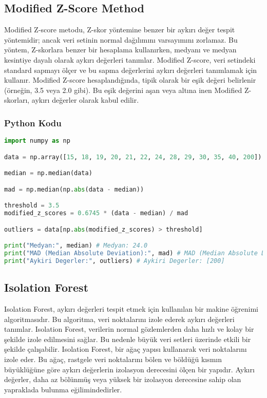 \newpage

\subsection{Modified Z-Score Method}
Modified Z-score metodu, Z-skor yöntemine benzer bir aykırı değer tespit yöntemidir; ancak veri setinin normal dağılımını varsayımını zorlamaz. Bu yöntem, Z-skorlara benzer bir hesaplama kullanırken, medyanı ve medyan kesintiye dayalı olarak aykırı değerleri tanımlar. Modified Z-score, veri setindeki standard sapmayı ölçer ve bu sapma değerlerini aykırı değerleri tanımlamak için kullanır. Modified Z-score hesaplandığında, tipik olarak bir eşik değeri belirlenir (örneğin, 3.5 veya 2.0 gibi). Bu eşik değerini aşan veya altına inen Modified Z-skorları, aykırı değerler olarak kabul edilir.

\subsubsection{Python Kodu}

\begin{lstlisting}[language=Python]
import numpy as np

data = np.array([15, 18, 19, 20, 21, 22, 24, 28, 29, 30, 35, 40, 200])

median = np.median(data)

mad = np.median(np.abs(data - median))

threshold = 3.5
modified_z_scores = 0.6745 * (data - median) / mad

outliers = data[np.abs(modified_z_scores) > threshold]

print("Medyan:", median) # Medyan: 24.0
print("MAD (Median Absolute Deviation):", mad) # MAD (Median Absolute Deviation): 5.0
print("Aykiri Degerler:", outliers) # Aykiri Degerler: [200]
\end{lstlisting}

\newpage

\subsection{Isolation Forest}
Isolation Forest, aykırı değerleri tespit etmek için kullanılan bir makine öğrenimi algoritmasıdır. Bu algoritma, veri noktalarını izole ederek aykırı değerleri tanımlar. Isolation Forest, verilerin normal gözlemlerden daha hızlı ve kolay bir şekilde izole edilmesini sağlar. Bu nedenle büyük veri setleri üzerinde etkili bir şekilde çalışabilir. Isolation Forest, bir ağaç yapısı kullanarak veri noktalarını izole eder. Bu ağaç, rastgele veri noktalarını bölen ve böldüğü kısmın büyüklüğüne göre aykırı değerlerin izolasyon derecesini ölçen bir yapıdır. Aykırı değerler, daha az bölünmüş veya yüksek bir izolasyon derecesine sahip olan yapraklada bulunma eğilimindedirler.

